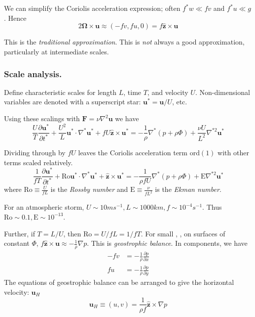 \documentclass{jknotes}
\begin{document}
We can simplify the Coriolis acceleration expression; often $f^* w \ll f v$
and $f^* u \ll g$. Hence
\begin{equation}
	2 \symbf{\Omega} \times \symbf{u} \approx (-fv, fu, 0) = f \hat{\symbf{z}} \times
	\symbf{u}
\end{equation}

This is the \emph{traditional approximation}. This is \emph{not} always a good
approximation, particularly at intermediate scales.

\subsubsection{Scale analysis.}
Define characteristic scales for length $L$, time $T$, and velocity $U$.
Non-dimensional variables are denoted with a superscript star: $\symbf{u}^* =
\symbf{u}/U$, etc.

Using these scalings with $\symbf{F} = \nu \nabla^2 \symbf{u}$ we have
\begin{equation}
	\frac{U}{T} \frac{\partial \symbf{u}^*}{\partial t^*} + \frac{U^2}{L}
	\symbf{u}^* \cdot \nabla^* \symbf{u}^* + fU \hat{\symbf{z}} \times \symbf{u}^* =
	-\frac{1}{\rho} \nabla^* \left(p + \rho \Phi\right) + \frac{\nu U}{L^2}
	\nabla^{*2}
		\symbf{u}^*
\end{equation}

Dividing through by $fU$ leaves the Coriolis acceleration term $\text{ord}(1)$ with
other terms scaled relatively.
\begin{equation}
	\frac{1}{fT} \frac{\partial \symbf{u}^*}{\partial t^*} + \text{Ro}	\symbf{u}^*
	\cdot \nabla^* \symbf{u}^* + \hat{\symbf{z}} \times \symbf{u}^* =
	-\frac{1}{\rho f U} \nabla^* \left(p + \rho \Phi\right) + \text{E}
	\nabla^{*2}
		\symbf{u}^*
\end{equation}
where $\text{Ro} \equiv \frac{U}{fL}$ is the \emph{Rossby number} and
$\text{E} \equiv \frac{\nu}{fL^2}$ is the \emph{Ekman number}.

\begin{eg}
	For an atmospheric storm, $U \sim 10 m s^{-1}, L \sim 1000 km, f \sim
	10^{-4} s^{-1}$. Thus $\text{Ro} \sim 0.1, \text{E} \sim 10^{-13}$.
\end{eg}

Further, if $T = L/U$, then $\text{Ro} = U/fL = 1/fT$. For small \Ro, \Ek, 
on surfaces of constant $\Phi$, $f \hat{\symbf{z}} \times \symbf{u} \approx
-\frac{1}{\rho}\nabla p$.  This is \emph{geostrophic balance}. In components,
we have
\begin{equation}
	\begin{aligned}
		-fv &= -\frac{1}{\rho}\frac{\partial p}{\partial x} \\
		fu &= -\frac{1}{\rho}\frac{\partial p}{\partial y}
	\end{aligned}
\end{equation}
The equations of geostrophic balance can be arranged to give the horizontal
velocity:
$\symbf{u}_H$
\begin{equation}
	\symbf{u}_H \equiv (u,v) = \frac{1}{\rho f} \hat{\symbf{z}} \times \nabla p
\end{equation}
\end{document}
